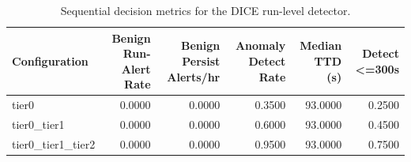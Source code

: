 \begin{table}[t]
\centering
\caption{Sequential decision metrics for the DICE run-level detector.}
\label{tab:dice_sequential_metrics}
\footnotesize
\begin{tabular}{lrrrrr}
\toprule
Configuration & Benign Run-Alert Rate & Benign Persist Alerts/hr & Anomaly Detect Rate & Median TTD (s) & Detect <=300s \\
\midrule
tier0 & 0.0000 & 0.0000 & 0.3500 & 93.0000 & 0.2500 \\
tier0_tier1 & 0.0000 & 0.0000 & 0.6000 & 93.0000 & 0.4500 \\
tier0_tier1_tier2 & 0.0000 & 0.0000 & 0.9500 & 93.0000 & 0.7500 \\
\bottomrule
\end{tabular}

\end{table}
